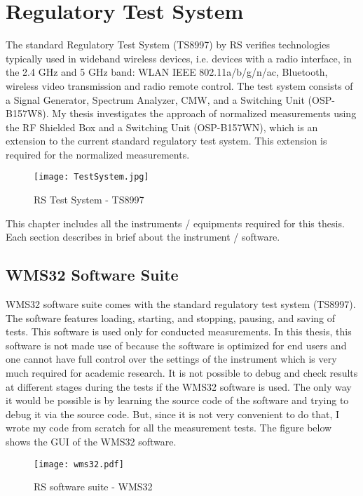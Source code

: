 \chapter{Regulatory Test System}  \label{chap:3}

The standard Regulatory Test System (TS8997) by \acs{RS}\textregistered{} verifies technologies typically used in wideband wireless devices, i.e. devices with a radio interface, in the 2.4 GHz and 5 GHz band: \acs{WLAN} \acs{IEEE} 802.11a/b/g/n/ac, Bluetooth\textregistered, wireless video transmission and radio remote control. The test system consists of a Signal Generator, Spectrum Analyzer,  \acf{CMW}, and a Switching Unit (OSP-B157W8). My thesis investigates the approach of normalized measurements using the \acs{RF} Shielded Box and a Switching Unit (OSP-B157WN), which is an extension to the current standard regulatory test system. This extension is required for the normalized measurements.

\begin{figure}[H]
\centering
\texttt{[image: TestSystem.jpg]}
\caption{\acs{RS}\textregistered{} Test System - TS8997}
\label{fig:testsystem}
\end{figure}

This chapter includes all the instruments / equipments required for this thesis. Each section describes in brief about the instrument / software.

\section{WMS32 Software Suite}
\label{sec:wms32}
WMS32 software suite comes with the standard regulatory test system (TS8997). The software features loading, starting, and stopping, pausing, and saving of tests. This software is used only for conducted measurements. In this thesis, this software is not made use of because the software is optimized for end users and one cannot have full control over the settings of the instrument which is very much required for academic research. It is not possible to debug and check results at different stages during the tests if the WMS32 software is used. The only way it would be possible is by learning the source code of the software and trying to debug it via the source code. But, since it is not very convenient to do that, I wrote my code from scratch for all the measurement tests. The figure below shows the \acs{GUI} of the WMS32 software.

\begin{figure}[H]
\centering
\texttt{[image: wms32.pdf]}
\caption{\acs{RS} software suite - WMS32}
\label{fig:softwaresuite}
\end{figure}


